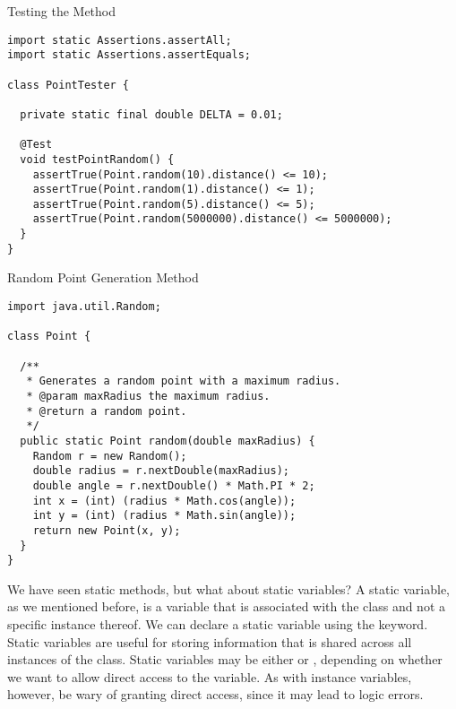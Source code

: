 \begin{cl}{Testing the  Method}
\begin{lstlisting}[language=MyJava]
import static Assertions.assertAll;
import static Assertions.assertEquals;

class PointTester {

  private static final double DELTA = 0.01;

  @Test
  void testPointRandom() {
    assertTrue(Point.random(10).distance() <= 10);
    assertTrue(Point.random(1).distance() <= 1);
    assertTrue(Point.random(5).distance() <= 5);
    assertTrue(Point.random(5000000).distance() <= 5000000);
  }
}
\end{lstlisting}
\end{cl}

\begin{cl}{Random Point Generation Method}
\begin{lstlisting}[language=MyJava]
import java.util.Random;

class Point {

  /**
   * Generates a random point with a maximum radius.
   * @param maxRadius the maximum radius.
   * @return a random point.
   */
  public static Point random(double maxRadius) {
    Random r = new Random();
    double radius = r.nextDouble(maxRadius);
    double angle = r.nextDouble() * Math.PI * 2;
    int x = (int) (radius * Math.cos(angle));
    int y = (int) (radius * Math.sin(angle));
    return new Point(x, y);
  }
}
\end{lstlisting}
\end{cl}

We have seen static methods, but what about static variables? A static variable, as we mentioned before, is a variable that is associated with the class and not a specific instance thereof. We can declare a static variable using the  keyword. Static variables are useful for storing information that is shared across all instances of the class. Static variables may be either  or , depending on whether we want to allow direct access to the variable. As with instance variables, however, be wary of granting direct access, since it may lead to logic errors.


